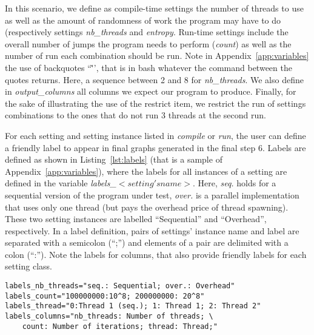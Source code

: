 In this scenario, we define as compile-time settings the number of threads to use as well as the amount of randomness of work the program may have to do (respectively settings \emph{nb\_threads} and \emph{entropy}. Run-time settings include the overall number of jumps the program needs to perform (\emph{count}) as well as the number of run each combination should be run. Note in Appendix~\ref{app:variables} the use of backquotes ``\`'', that is in bash whatever the command between the quotes returns. Here, a sequence between 2 and 8 for \emph{nb\_threads}. We also define in \emph{output\_columns} all columns we expect our program to produce. Finally, for the sake of illustrating the use of the restrict item, we restrict the run of settings combinations to the ones that do not run 3 threads at the second run.

For each setting and setting instance listed in \emph{compile} or \emph{run}, the user can define a friendly label to appear in final graphs generated in the final step 6. Labels are defined as shown in Listing~\ref{lst:labels} (that is a sample of Appendix~\ref{app:variables}), where the labels for all instances of a setting are defined in the variable \emph{labels\_}$<setting's name>$. Here, \emph{seq.} holds for a sequential version of the program under test, \emph{over.} is a parallel implementation that uses only one thread (but pays the overhead price of thread spawning). These two setting instances are labelled ``Sequential'' and ``Overhead'', respectively. In a label definition, pairs of settings' instance name and label are separated with a semicolon (``;'') and elements of a pair are delimited with a colon (``:''). Note the labels for columns, that also provide friendly labels for each setting class.

\begin{lstlisting}[caption={Define human-friendly labels for each setting and setting instance.},label={lst:labels}]
labels_nb_threads="seq.: Sequential; over.: Overhead"
labels_count="100000000:10^8; 200000000: 20^8"
labels_thread="0:Thread 1 (seq.); 1: Thread 1; 2: Thread 2"
labels_columns="nb_threads: Number of threads; \
	count: Number of iterations; thread: Thread;"
\end{lstlisting}

